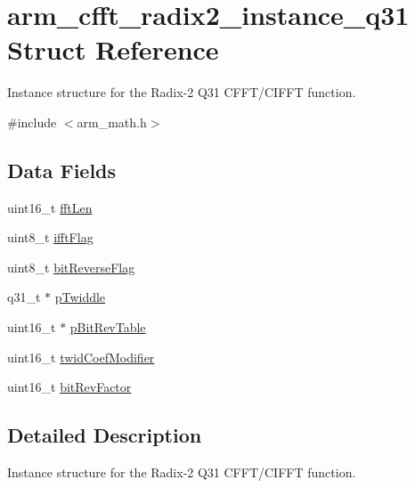 \hypertarget{structarm__cfft__radix2__instance__q31}{}\section{arm\+\_\+cfft\+\_\+radix2\+\_\+instance\+\_\+q31 Struct Reference}
\label{structarm__cfft__radix2__instance__q31}


Instance structure for the Radix-\/2 Q31 C\+F\+F\+T/\+C\+I\+F\+FT function.  




{\ttfamily \#include $<$arm\+\_\+math.\+h$>$}

\subsection*{Data Fields}
\begin{DoxyCompactItemize}
\item 
uint16\+\_\+t \mbox{\hyperlink{structarm__cfft__radix2__instance__q31_ab8db3bbe7c61e6bb8ca2a55e3446e11a}{fft\+Len}}
\item 
uint8\+\_\+t \mbox{\hyperlink{structarm__cfft__radix2__instance__q31_ad6ca6e223f986ebfd94c5ee1e410aa73}{ifft\+Flag}}
\item 
uint8\+\_\+t \mbox{\hyperlink{structarm__cfft__radix2__instance__q31_a09a221a818c6d0e064557a99e2fe9a8b}{bit\+Reverse\+Flag}}
\item 
q31\+\_\+t $\ast$ \mbox{\hyperlink{structarm__cfft__radix2__instance__q31_a2505b7d5ec077b244c712797a5253b6d}{p\+Twiddle}}
\item 
uint16\+\_\+t $\ast$ \mbox{\hyperlink{structarm__cfft__radix2__instance__q31_a46a2fb328199897af100fea0bfdf59aa}{p\+Bit\+Rev\+Table}}
\item 
uint16\+\_\+t \mbox{\hyperlink{structarm__cfft__radix2__instance__q31_afe772e5b5001c9d8e85032115a8df5bf}{twid\+Coef\+Modifier}}
\item 
uint16\+\_\+t \mbox{\hyperlink{structarm__cfft__radix2__instance__q31_a33386d95319dc3ee7097b3a8e52e01ec}{bit\+Rev\+Factor}}
\end{DoxyCompactItemize}


\subsection{Detailed Description}
Instance structure for the Radix-\/2 Q31 C\+F\+F\+T/\+C\+I\+F\+FT function. 

